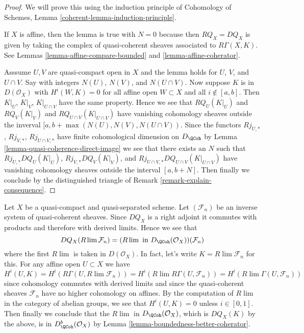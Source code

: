 \begin{proof}
We will prove this using the induction principle of
Cohomology of Schemes, Lemma \ref{coherent-lemma-induction-principle}.

\medskip\noindent
If $X$ is affine, then the lemma is true with $N = 0$ because then
$RQ_X = DQ_X$ is given by taking the complex of
quasi-coherent sheaves associated to $R\Gamma(X, K)$.
See Lemmas \ref{lemma-affine-compare-bounded} and \ref{lemma-affine-coherator}.

\medskip\noindent
Asssume $U, V$ are quasi-compact open in $X$
and the lemma holds for $U$, $V$, and $U \cap V$.
Say with integers $N(U)$, $N(V)$, and $N(U \cap V)$.
Now suppose $K$ is in $D(\mathcal{O}_X)$ with
$H^i(W, K) = 0$ for all affine open $W \subset X$ and all $i \not \in [a, b]$.
Then $K|_U$, $K|_V$, $K|_{U \cap V}$ have the same property.
Hence we see that $RQ_U(K|_U)$ and $RQ_V(K|_V)$ and
$RQ_{U \cap V}(K|_{U \cap V})$ have vanishing cohomology
sheaves outside the inverval $[a, b + \max(N(U), N(V), N(U \cap V))$.
Since the functors $Rj_{U, *}$, $Rj_{V, *}$, $Rj_{U \cap V, *}$
have finite cohomological dimension on $D_\QCoh$ by
Lemma \ref{lemma-quasi-coherence-direct-image}
we see that there exists an $N$ such that
$Rj_{U, *}DQ_U(K|_U)$, $Rj_{V, *}DQ_V(K|_V)$, and
$Rj_{U \cap V, *}DQ_{U \cap V}(K|_{U \cap V})$ have vanishing
cohomology sheaves outside the interval $[a, b + N]$.
Then finally we conclude by the distinguished triangle
of Remark \ref{remark-explain-consequence}.
\end{proof}

\begin{example}
\label{example-inverse-limit-quasi-coherent}
Let $X$ be a quasi-compact and quasi-separated scheme. Let $(\mathcal{F}_n)$
be an inverse system of quasi-coherent sheaves. Since $DQ_X$ is a right
adjoint it commutes with products and therefore with derived limits.
Hence we see that
$$
DQ_X(R\lim \mathcal{F}_n) =
(R\lim\text{ in }D_\QCoh(\mathcal{O}_X))(\mathcal{F}_n)
$$
where the first $R\lim$ is taken in $D(\mathcal{O}_X)$.
In fact, let's write $K = R\lim \mathcal{F}_n$ for this.
For any affine open $U \subset X$ we have
$$
H^i(U, K) =
H^i(R\Gamma(U, R\lim \mathcal{F}_n)) =
H^i(R\lim R\Gamma(U, \mathcal{F}_n)) =
H^i(R\lim \Gamma(U, \mathcal{F}_n))
$$
since cohomology commutes with derived limits and since
the quasi-coherent sheaves
$\mathcal{F}_n$ have no higher cohomology on affines.
By the computation of $R\lim$ in the category of
abelian groups, we see that $H^i(U, K) = 0$
unless $i \in [0, 1]$. Then finally we conclude that
the $R\lim$ in $D_\QCoh(\mathcal{O}_X)$, which is
$DQ_X(K)$ by the above, is in $D^b_\QCoh(\mathcal{O}_X)$
by Lemma \ref{lemma-boundedness-better-coherator}.
\end{example}













